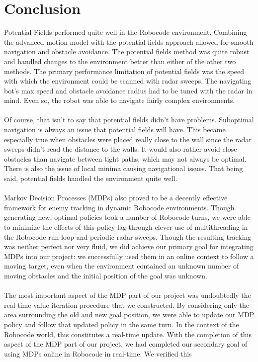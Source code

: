 \documentclass{aiaa-tc}%
\begin{document}
\section{Conclusion}
\label{Conclusion}
\noindent
Potential Fields performed quite well in the Robocode environment. Combining the advanced motion model with the potential fields approach allowed for smooth navigation and obstacle avoidance. The potential fields method was quite robust and handled changes to the environment better than either of the other two methods. The primary performance limitation of potential fields was the speed with which the environment could be scanned with radar sweeps. The navigating bot's max speed and obstacle avoidance radius had to be tuned with the radar in mind. Even so, the robot was able to navigate fairly complex environments. \\ \\
Of course, that isn't to say that potential fields didn't have problems. Suboptimal navigation is always an issue that potential fields will have. This became especially true when obstacles were placed really close to the wall since the radar sweeps didn't read the distance to the walls. It would also rather avoid close obstacles than navigate between tight paths, which may not always be optimal. There is also the issue of local minima causing navigational issues. That being said, potential fields handled the environment quite well. \\ \\
Markov Decision Processes (MDPs) also proved to be a decently effective framework for enemy tracking in dynamic Robocode environments. Though generating new, optimal policies took a number of Robocode
turns, we were able to minimize the effects of this policy lag through clever use of multithreading in the Robocode run-loop and periodic radar sweeps. Though the resulting tracking was neither perfect nor very fluid,
we did achieve our primary goal for integrating MDPs into our project: we successfully used them in an online context to follow a moving target, even when the environment contained an unknown number of moving obstacles and the initial position
of the goal was unknown. \\ \\
The most important aspect of the MDP part of our project was undoubtedly the real-time value iteration procedure that we constructed. By considering only the area surrounding the old and new goal position, we were able to update our MDP policy and follow
that updated policy in the same turn. In the context of the Robocode world, this constitutes a real-time update. With the completion of this aspect of the MDP part of our project, we had completed our secondary goal of using MDPs online in Robocode in real-time. We verified this
\end{document}
